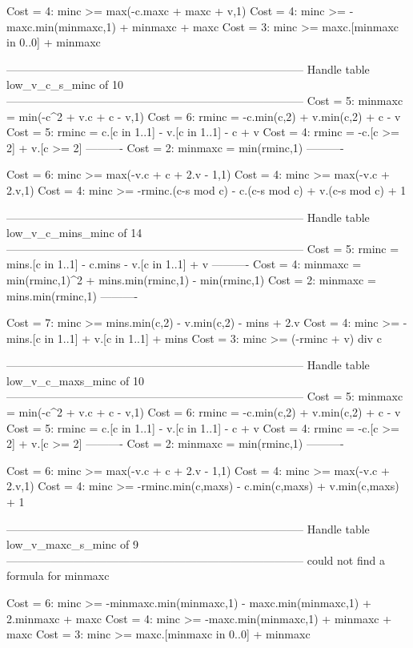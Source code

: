 Cost =  4:  minc >= max(-c.maxc + maxc + v,1)
Cost =  4:  minc >= -maxc.min(minmaxc,1) + minmaxc + maxc
Cost =  3:  minc >= maxc.[minmaxc in 0..0] + minmaxc

--------------------------------------------------------------------------------
Handle table low_v_c_s_minc of 10
--------------------------------------------------------------------------------
Cost =  5:  minmaxc = min(-c^2 + v.c + c - v,1)
Cost =  6:  rminc   = -c.min(c,2) + v.min(c,2) + c - v
Cost =  5:  rminc   = c.[c in 1..1] - v.[c in 1..1] - c + v
Cost =  4:  rminc   = -c.[c >= 2] + v.[c >= 2]
----------
Cost =  2:  minmaxc = min(rminc,1)
----------

Cost =  6:  minc >= max(-v.c + c + 2.v - 1,1)
Cost =  4:  minc >= max(-v.c + 2.v,1)
Cost =  4:  minc >= -rminc.(c-s mod c) - c.(c-s mod c) + v.(c-s mod c) + 1

--------------------------------------------------------------------------------
Handle table low_v_c_mins_minc of 14
--------------------------------------------------------------------------------
Cost =  5:  rminc   = mins.[c in 1..1] - c.mins - v.[c in 1..1] + v
----------
Cost =  4:  minmaxc = min(rminc,1)^2 + mins.min(rminc,1) - min(rminc,1)
Cost =  2:  minmaxc = mins.min(rminc,1)
----------

Cost =  7:  minc >= mins.min(c,2) - v.min(c,2) - mins + 2.v
Cost =  4:  minc >= -mins.[c in 1..1] + v.[c in 1..1] + mins
Cost =  3:  minc >= (-rminc + v) div c

--------------------------------------------------------------------------------
Handle table low_v_c_maxs_minc of 10
--------------------------------------------------------------------------------
Cost =  5:  minmaxc = min(-c^2 + v.c + c - v,1)
Cost =  6:  rminc   = -c.min(c,2) + v.min(c,2) + c - v
Cost =  5:  rminc   = c.[c in 1..1] - v.[c in 1..1] - c + v
Cost =  4:  rminc   = -c.[c >= 2] + v.[c >= 2]
----------
Cost =  2:  minmaxc = min(rminc,1)
----------

Cost =  6:  minc >= max(-v.c + c + 2.v - 1,1)
Cost =  4:  minc >= max(-v.c + 2.v,1)
Cost =  4:  minc >= -rminc.min(c,maxs) - c.min(c,maxs) + v.min(c,maxs) + 1

--------------------------------------------------------------------------------
Handle table low_v_maxc_s_minc of 9
--------------------------------------------------------------------------------
could not find a formula for minmaxc

Cost =  6:  minc >= -minmaxc.min(minmaxc,1) - maxc.min(minmaxc,1) + 2.minmaxc + maxc
Cost =  4:  minc >= -maxc.min(minmaxc,1) + minmaxc + maxc
Cost =  3:  minc >= maxc.[minmaxc in 0..0] + minmaxc

